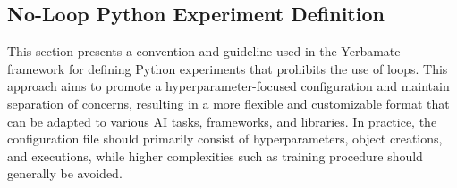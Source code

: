 \subsection{No-Loop Python Experiment Definition}

This section presents a convention and guideline used in the Yerbamate framework for defining Python experiments that prohibits the use of loops. This approach aims to promote a hyperparameter-focused configuration and maintain separation of concerns, resulting in a more flexible and customizable format that can be adapted to various AI tasks, frameworks, and libraries. In practice, the configuration file should primarily consist of hyperparameters, object creations, and executions, while higher complexities such as training procedure should generally be avoided.






